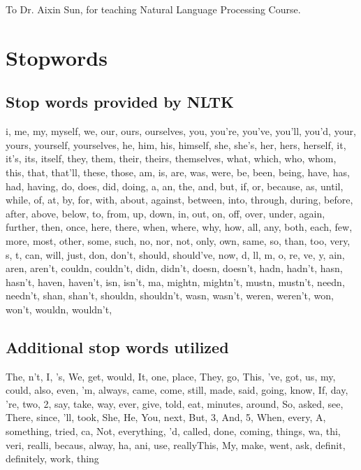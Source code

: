 \documentclass[sigconf]{acmart}
\begin{document}
\begin{acks}
To Dr. Aixin Sun, for teaching Natural Language Processing Course.
\end{acks}




\appendix
\section{Stopwords}
\subsection{Stop words provided by NLTK}
i, me, my, myself, we, our, ours, ourselves, you, you're, you've, you'll, you'd, your, yours, yourself, yourselves, he, him, his, himself, she, she's, her, hers, herself, it, it's, its, itself, they, them, their, theirs, themselves, what, which, who, whom, this, that, that'll, these, those, am, is, are, was, were, be, been, being, have, has, had, having, do, does, did, doing, a, an, the, and, but, if, or, because, as, until, while, of, at, by, for, with, about, against, between, into, through, during, before, after, above, below, to, from, up, down, in, out, on, off, over, under, again, further, then, once, here, there, when, where, why, how, all, any, both, each, few, more, most, other, some, such, no, nor, not, only, own, same, so, than, too, very, s, t, can, will, just, don, don't, should, should've, now, d, ll, m, o, re, ve, y, ain, aren, aren't, couldn, couldn't, didn, didn't, doesn, doesn't, hadn, hadn't, hasn, hasn't, haven, haven't, isn, isn't, ma, mightn, mightn't, mustn, mustn't, needn, needn't, shan, shan't, shouldn, shouldn't, wasn, wasn't, weren, weren't, won, won't, wouldn, wouldn't, 

\subsection{Additional stop words utilized}
The, n't, I, 's, We, get, would, It, one, place, They, go, This, 've, got, us, my, could, also, even, 'm, always, came, come, still, made, said, going, know, If, day, 're, two, 2, say, take, way, ever, give, told, eat, minutes, around, So, asked, see, There, since, 'll, took, She, He, You, next, But, 3, And, 5, When, every, A, something, tried, ca, Not, everything, 'd, called, done, coming, things, wa, thi, veri, realli, becaus, alway, ha, ani, use, reallyThis, My, make, went, ask, definit, definitely, work, thing
\end{document}
